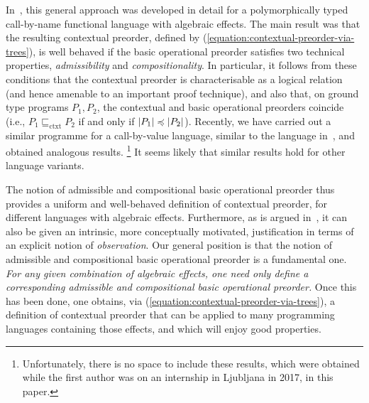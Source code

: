 In~\cite{gom}, this general approach was developed in detail for 
a polymorphically typed call-by-name functional language with algebraic effects. 
The main result was that the resulting contextual preorder, defined by (\ref{equation:contextual-preorder-via-trees}), is well behaved if the basic operational preorder satisfies two technical properties, \emph{admissibility} and \emph{compositionality}. In particular, it follows from these conditions that 
the contextual preorder is characterisable as a {logical relation} (and hence amenable to an important proof technique), and also that, on ground type programs $P_1,P_2$,
the contextual and basic operational preorders coincide (i.e., $P_1 \sqsubseteq_\text{ctxt} P_2$ if and only if
$|P_1| \preccurlyeq |P_2|$). 
Recently, we have carried out a similar programme for a call-by-value language,
similar to the language in~\cite{plotkin2001adequacy}, and obtained analogous results.%
\footnote{\label{footnote:unpublished}Unfortunately, there is no space to include these results, which were obtained while the first author was on an internship in Ljubljana in 2017, in this paper.}
It seems likely that similar results hold for other language variants.



The
notion of admissible and  compositional basic operational preorder thus provides a uniform and well-behaved definition of contextual preorder, for different languages with algebraic effects. Furthermore,
as is argued in~\cite[\S{V}]{gom}, it can also be given an intrinsic, more conceptually motivated, justification in terms of an explicit  notion of \emph{observation}. 
Our general position is that the notion of admissible and  compositional basic operational preorder is a fundamental one. 
\emph{For any given combination of algebraic effects, one need only define a corresponding admissible and compositional basic operational preorder.} Once this has been done,  one obtains, via (\ref{equation:contextual-preorder-via-trees}), a definition of contextual preorder that can be applied to many programming languages containing those effects, and which will enjoy good properties.

